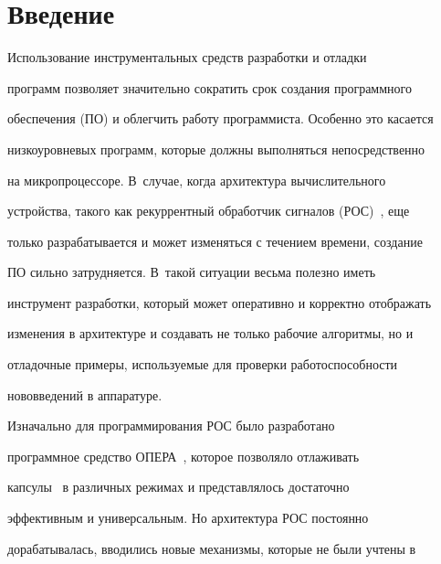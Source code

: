 




 \thispagestyle{empty}





\section{Введение}





      Использование инструментальных средств разработки и отладки 


программ позволяет значительно сократить срок создания программного 


обеспечения (ПО) и облегчить работу программиста. Особенно это касается 


низкоуровневых программ, которые должны выполняться непосредственно 


на микропроцессоре. В~случае, когда архитектура вычислительного 


устройства, такого как рекуррентный обработчик сигналов (РОС)~\cite{1-2}, еще 


только разрабатывается и может изменяться с течением времени, создание 


ПО сильно затрудняется. В~такой ситуации весьма полезно иметь 


инструмент разработки, который может оперативно и корректно отображать 


изменения в архитектуре и создавать не только рабочие алгоритмы, но и 


отладочные примеры, используемые для проверки работоспособности 


нововведений в аппаратуре.


      


      Изначально для программирования РОС было разработано 


программное средство ОПЕРА~\cite{2-2}, которое позволяло отлаживать 


капсулы~\cite{3-2} в различных режимах и представлялось достаточно 


эффективным и универсальным. Но архитектура РОС постоянно 


дорабатывалась, вводились новые механизмы, которые не были учтены в 


